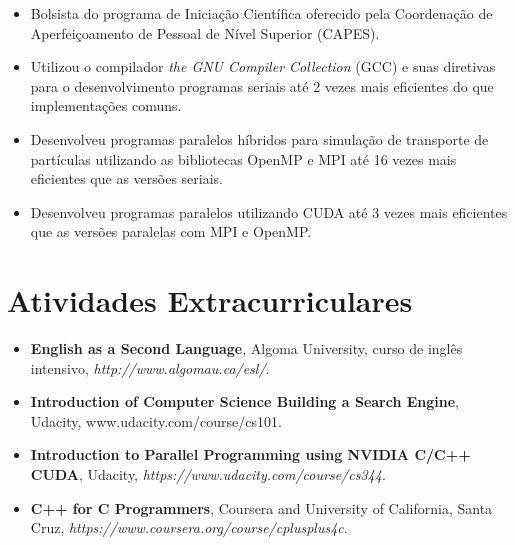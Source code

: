 \documentclass[a4paper, oneside, final]{scrartcl} %
\begin{document}
\begin{center}
\begin{tabularx}{0.97\linewidth}{>{\raggedleft\scshape}p{2.2cm}X}
\end{tabularx}

\begin{itemize}

\item Bolsista do programa de Iniciação Científica oferecido pela Coordenação de Aperfeiçoamento de Pessoal de Nível Superior (CAPES).

\item Utilizou o compilador \textit{the GNU Compiler Collection} (GCC) e suas diretivas para o desenvolvimento programas seriais até 2 vezes mais eficientes do que implementações comuns.

\item Desenvolveu programas paralelos híbridos para simulação de transporte de partículas utilizando as bibliotecas OpenMP e MPI até 16 vezes mais eficientes que as versões seriais.

\item Desenvolveu programas paralelos utilizando CUDA até 3 vezes mais eficientes que as versões paralelas com MPI e OpenMP.

\end{itemize}

\section{Atividades Extracurriculares}
\begin{itemize}

\item \textbf{English as a Second Language}, Algoma University, curso de inglês intensivo, \textit{http://www.algomau.ca/esl/}.   

\item \textbf{Introduction of Computer Science Building a Search Engine}, Udacity, \linebreak www.udacity.com/course/cs101. 

\item \textbf{Introduction to Parallel Programming using NVIDIA C/C++ CUDA}, Udacity, \textit{https://www.udacity.com/course/cs344}.

\item \textbf{C++ for C Programmers}, Coursera and University of California, Santa Cruz, \textit{https://www.coursera.org/course/cplusplus4c}.


\end{itemize}
\end{center}
\end{document}
